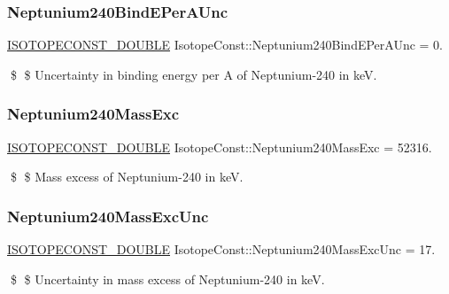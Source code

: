 \subsubsection{\texorpdfstring{Neptunium240\+Bind\+E\+Per\+A\+Unc}{Neptunium240BindEPerAUnc}}
{\footnotesize\ttfamily \mbox{\hyperlink{group___isotope_const-_macros_ga8f45a7272ce02c0b4c65c44636ed719a}{I\+S\+O\+T\+O\+P\+E\+C\+O\+N\+S\+T\+\_\+\+D\+O\+U\+B\+LE}} Isotope\+Const\+::\+Neptunium240\+Bind\+E\+Per\+A\+Unc = 0.}

\$ \$ Uncertainty in binding energy per A of Neptunium-\/240 in keV. \mbox{\label{group___isotope_const-_neptunium-_np240_ga167c5fbf05bf48a3ebb6503fc49b2ac5}} 
\subsubsection{\texorpdfstring{Neptunium240\+Mass\+Exc}{Neptunium240MassExc}}
{\footnotesize\ttfamily \mbox{\hyperlink{group___isotope_const-_macros_ga8f45a7272ce02c0b4c65c44636ed719a}{I\+S\+O\+T\+O\+P\+E\+C\+O\+N\+S\+T\+\_\+\+D\+O\+U\+B\+LE}} Isotope\+Const\+::\+Neptunium240\+Mass\+Exc = 52316.}

\$ \$ Mass excess of Neptunium-\/240 in keV. \mbox{\label{group___isotope_const-_neptunium-_np240_ga83ff6590e44c0d979a3697bf143c4445}} 
\subsubsection{\texorpdfstring{Neptunium240\+Mass\+Exc\+Unc}{Neptunium240MassExcUnc}}
{\footnotesize\ttfamily \mbox{\hyperlink{group___isotope_const-_macros_ga8f45a7272ce02c0b4c65c44636ed719a}{I\+S\+O\+T\+O\+P\+E\+C\+O\+N\+S\+T\+\_\+\+D\+O\+U\+B\+LE}} Isotope\+Const\+::\+Neptunium240\+Mass\+Exc\+Unc = 17.}

\$ \$ Uncertainty in mass excess of Neptunium-\/240 in keV. \mbox{\label{group___isotope_const-_neptunium-_np240_gacc9fec720eb3591f1d86a958cf7a1cb3}} 
